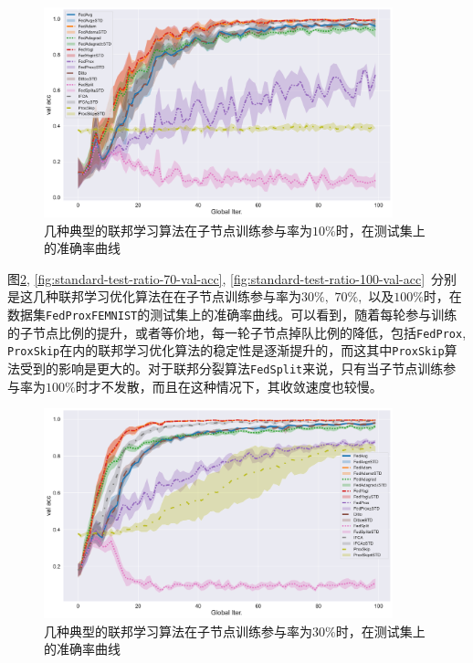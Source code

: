 \begin{figure}[H]
    \centering
    \includegraphics[width=0.9\textwidth]{figures/standard-test-ratio-10-val-acc.pdf}
    \caption{几种典型的联邦学习算法在子节点训练参与率为$10\%$时，在测试集上的准确率曲线}
    \label{fig:standard-test-ratio-10-val-acc}
\end{figure}

图\ref{fig:standard-test-ratio-30-val-acc}, \ref{fig:standard-test-ratio-70-val-acc}, \ref{fig:standard-test-ratio-100-val-acc}~分别是这几种联邦学习优化算法在在子节点训练参与率为$30\%,$ $70\%,$ 以及$100\%$时，在数据集\texttt{FedProxFEMNIST}的测试集上的准确率曲线。可以看到，随着每轮参与训练的子节点比例的提升，或者等价地，每一轮子节点掉队比例的降低，包括\texttt{FedProx}, \texttt{ProxSkip}在内的联邦学习优化算法的稳定性是逐渐提升的，而这其中\texttt{ProxSkip}算法受到的影响是更大的。对于联邦分裂算法\texttt{FedSplit}来说，只有当子节点训练参与率为$100\%$时才不发散，而且在这种情况下，其收敛速度也较慢。

\begin{figure}[H]
    \centering
    \includegraphics[width=0.9\textwidth]{figures/standard-test-ratio-30-val-acc.pdf}
    \caption{几种典型的联邦学习算法在子节点训练参与率为$30\%$时，在测试集上的准确率曲线}
    \label{fig:standard-test-ratio-30-val-acc}
\end{figure}

